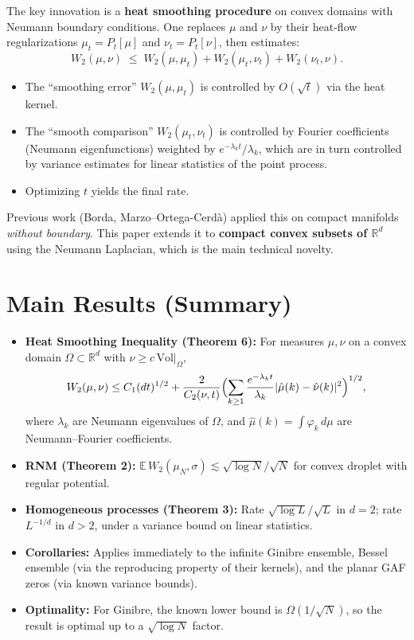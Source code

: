 \documentclass[11pt,a4paper]{article}
\theoremstyle{definition}
\begin{document}
The key innovation is a \textbf{heat smoothing procedure} on convex domains with Neumann boundary conditions. One replaces $\mu$ and $\nu$ by their heat-flow regularizations $\mu_t = P_t[\mu]$ and $\nu_t = P_t[\nu]$, then estimates:
\[
W_2(\mu,\nu) \;\le\; W_2(\mu,\mu_t) + W_2(\mu_t,\nu_t) + W_2(\nu_t,\nu).
\]
\begin{itemize}[nosep]
  \item The ``smoothing error'' $W_2(\mu,\mu_t)$ is controlled by $O(\sqrt{t})$ via the heat kernel.
  \item The ``smooth comparison'' $W_2(\mu_t,\nu_t)$ is controlled by Fourier coefficients (Neumann eigenfunctions) weighted by $e^{-\lambda_k t}/\lambda_k$, which are in turn controlled by variance estimates for linear statistics of the point process.
  \item Optimizing $t$ yields the final rate.
\end{itemize}

Previous work (Borda, Marzo--Ortega-Cerd\`a) applied this on compact manifolds \emph{without boundary}. This paper extends it to \textbf{compact convex subsets of $\mathbb{R}^d$} using the Neumann Laplacian, which is the main technical novelty.

\section{Main Results (Summary)}

\begin{itemize}
  \item \textbf{Heat Smoothing Inequality (Theorem 6):} For measures $\mu,\nu$ on a convex domain $\Omega\subset\mathbb{R}^d$ with $\nu\ge c\,\mathrm{Vol}|_\Omega$,
  \[
    W_2(\mu,\nu) \le C_1(dt)^{1/2} + \frac{2}{C_2(\nu,t)}\Bigl(\sum_{k\ge 1}\frac{e^{-\lambda_k t}}{\lambda_k}|\hat\mu(k)-\hat\nu(k)|^2\Bigr)^{1/2},
  \]
  where $\lambda_k$ are Neumann eigenvalues of $\Omega$, and $\hat\mu(k)=\int\varphi_k\,d\mu$ are Neumann--Fourier coefficients.

  \item \textbf{RNM (Theorem 2):} $\mathbb{E}\,W_2(\mu_N,\sigma)\lesssim\sqrt{\log N}/\sqrt{N}$ for convex droplet with regular potential.

  \item \textbf{Homogeneous processes (Theorem 3):} Rate $\sqrt{\log L}/\sqrt{L}$ in $d=2$; rate $L^{-1/d}$ in $d>2$, under a variance bound on linear statistics.

  \item \textbf{Corollaries:} Applies immediately to the infinite Ginibre ensemble, Bessel ensemble (via the reproducing property of their kernels), and the planar GAF zeros (via known variance bounds).

  \item \textbf{Optimality:} For Ginibre, the known lower bound is $\Omega(1/\sqrt{N})$, so the result is optimal up to a $\sqrt{\log N}$ factor.
\end{itemize}
\end{document}
